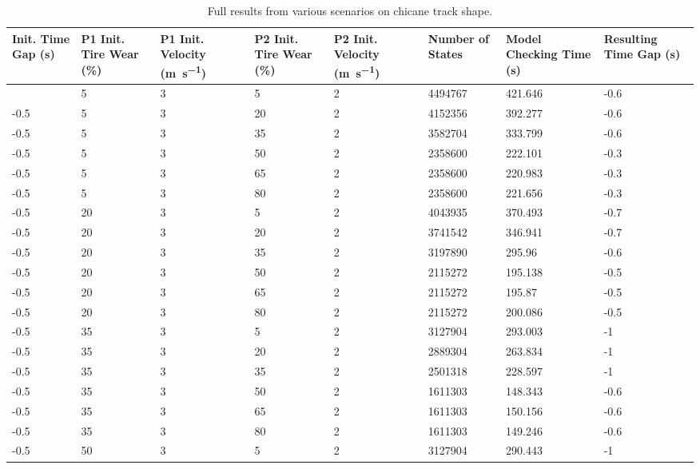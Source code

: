 \begin{longtable}{|p{1.4cm}|p{1.4cm}|p{1.4cm}|p{1.4cm}|p{1.4cm}|p{1.4cm}|p{1.4cm}|p{1.5cm}|}
    \hline
        Init. Time Gap (\si{\second}) & P1 Init. Tire Wear (\%) & P1 Init. Velocity (\si{\meter\per\second}) & P2 Init. Tire Wear (\%) & P2 Init. Velocity (\si{\meter\per\second}) & Number of States & Model Checking Time (\si{\second}) & Resulting Time Gap (\si{\second}) \\ \hline
        \endhead
        \addlinespace
\caption{Full results from various scenarios on chicane track shape.}        \endlastfoot
        -0.5 & 5 & 3 & 5 & 2 & 4494767 & 421.646 & -0.6 \\ \hline
        -0.5 & 5 & 3 & 20 & 2 & 4152356 & 392.277 & -0.6 \\ \hline
        -0.5 & 5 & 3 & 35 & 2 & 3582704 & 333.799 & -0.6 \\ \hline
        -0.5 & 5 & 3 & 50 & 2 & 2358600 & 222.101 & -0.3 \\ \hline
        -0.5 & 5 & 3 & 65 & 2 & 2358600 & 220.983 & -0.3 \\ \hline
        -0.5 & 5 & 3 & 80 & 2 & 2358600 & 221.656 & -0.3 \\ \hline
        -0.5 & 20 & 3 & 5 & 2 & 4043935 & 370.493 & -0.7 \\ \hline
        -0.5 & 20 & 3 & 20 & 2 & 3741542 & 346.941 & -0.7 \\ \hline
        -0.5 & 20 & 3 & 35 & 2 & 3197890 & 295.96 & -0.6 \\ \hline
        -0.5 & 20 & 3 & 50 & 2 & 2115272 & 195.138 & -0.5 \\ \hline
        -0.5 & 20 & 3 & 65 & 2 & 2115272 & 195.87 & -0.5 \\ \hline
        -0.5 & 20 & 3 & 80 & 2 & 2115272 & 200.086 & -0.5 \\ \hline
        -0.5 & 35 & 3 & 5 & 2 & 3127904 & 293.003 & -1 \\ \hline
        -0.5 & 35 & 3 & 20 & 2 & 2889304 & 263.834 & -1 \\ \hline
        -0.5 & 35 & 3 & 35 & 2 & 2501318 & 228.597 & -1 \\ \hline
        -0.5 & 35 & 3 & 50 & 2 & 1611303 & 148.343 & -0.6 \\ \hline
        -0.5 & 35 & 3 & 65 & 2 & 1611303 & 150.156 & -0.6 \\ \hline
        -0.5 & 35 & 3 & 80 & 2 & 1611303 & 149.246 & -0.6 \\ \hline
        -0.5 & 50 & 3 & 5 & 2 & 3127904 & 290.443 & -1 \\ \hline

\end{longtable}
